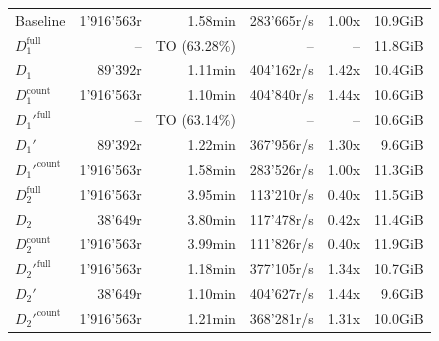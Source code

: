 \begin{longtable}{lrrrrr}
    \nopagebreak
    Baseline              &  1'916'563r           &  1.58min        &  283'665r/s          & 1.00x             & 10.9GiB   \\
    $D_1^{\text{full}}$   &  --                   &  TO (63.28\%)    &  --                  & --                & 11.8GiB   \\
    \quad $D_1$           &  89'392r              &  1.11min        &  404'162r/s          & 1.42x             & 10.4GiB   \\
    $D_1^{\text{count}}$  &  1'916'563r           &  1.10min        &  404'840r/s          & 1.44x             & 10.6GiB   \\
    $D_1'^{\text{full}}$  &  --                   &  TO (63.14\%)   &  --                  & --                & 10.6GiB   \\
    \quad $D_1'$          &  89'392r              &  1.22min        &  367'956r/s          & 1.30x             & 9.6GiB    \\
    $D_1'^{\text{count}}$ &  1'916'563r           &  1.58min        &  283'526r/s          & 1.00x             & 11.3GiB   \\
    $D_2^{\text{full}}$   &  1'916'563r           &  3.95min        &  113'210r/s          & 0.40x             & 11.5GiB   \\
    \quad $D_2$           &  38'649r              &  3.80min        &  117'478r/s          & 0.42x             & 11.4GiB   \\
    $D_2^{\text{count}}$  &  1'916'563r           &  3.99min        &  111'826r/s          & 0.40x             & 11.9GiB   \\
    $D_2'^{\text{full}}$  &  1'916'563r           &  1.18min        &  377'105r/s          & 1.34x             & 10.7GiB   \\
    \quad $D_2'$          &  38'649r              &  1.10min        &  404'627r/s          & 1.44x             & 9.6GiB    \\
    $D_2'^{\text{count}}$ &  1'916'563r           &  1.21min        &  368'281r/s          & 1.31x             & 10.0GiB   \\

    \bottomrule

\end{longtable}





